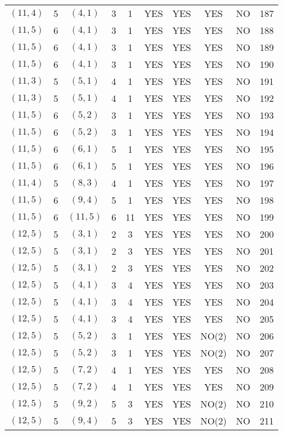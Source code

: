 \begin{longtable}{|c|c|c|c|c|c|c|c|c|c|}
$(11, 4)$ & 5 & $(4, 1)$ & 3 & 1 & YES & YES & YES & NO & 187\\
$(11, 5)$ & 6 & $(4, 1)$ & 3 & 1 & YES & YES & YES & NO & 188\\
$(11, 5)$ & 6 & $(4, 1)$ & 3 & 1 & YES & YES & YES & NO & 189\\
$(11, 5)$ & 6 & $(4, 1)$ & 3 & 1 & YES & YES & YES & NO & 190\\
$(11, 3)$ & 5 & $(5, 1)$ & 4 & 1 & YES & YES & YES & NO & 191\\
$(11, 3)$ & 5 & $(5, 1)$ & 4 & 1 & YES & YES & YES & NO & 192\\
$(11, 5)$ & 6 & $(5, 2)$ & 3 & 1 & YES & YES & YES & NO & 193\\
$(11, 5)$ & 6 & $(5, 2)$ & 3 & 1 & YES & YES & YES & NO & 194\\
$(11, 5)$ & 6 & $(6, 1)$ & 5 & 1 & YES & YES & YES & NO & 195\\
$(11, 5)$ & 6 & $(6, 1)$ & 5 & 1 & YES & YES & YES & NO & 196\\
$(11, 4)$ & 5 & $(8, 3)$ & 4 & 1 & YES & YES & YES & NO & 197\\
$(11, 5)$ & 6 & $(9, 4)$ & 5 & 1 & YES & YES & YES & NO & 198\\
$(11, 5)$ & 6 & $(11, 5)$ & 6 & 11 & YES & YES & YES & NO & 199\\
$(12, 5)$ & 5 & $(3, 1)$ & 2 & 3 & YES & YES & YES & NO & 200\\
$(12, 5)$ & 5 & $(3, 1)$ & 2 & 3 & YES & YES & YES & NO & 201\\
$(12, 5)$ & 5 & $(3, 1)$ & 2 & 3 & YES & YES & YES & NO & 202\\
$(12, 5)$ & 5 & $(4, 1)$ & 3 & 4 & YES & YES & YES & NO & 203\\
$(12, 5)$ & 5 & $(4, 1)$ & 3 & 4 & YES & YES & YES & NO & 204\\
$(12, 5)$ & 5 & $(4, 1)$ & 3 & 4 & YES & YES & YES & NO & 205\\
$(12, 5)$ & 5 & $(5, 2)$ & 3 & 1 & YES & YES & NO(2) & NO & 206\\
$(12, 5)$ & 5 & $(5, 2)$ & 3 & 1 & YES & YES & NO(2) & NO & 207\\
$(12, 5)$ & 5 & $(7, 2)$ & 4 & 1 & YES & YES & YES & NO & 208\\
$(12, 5)$ & 5 & $(7, 2)$ & 4 & 1 & YES & YES & YES & NO & 209\\
$(12, 5)$ & 5 & $(9, 2)$ & 5 & 3 & YES & YES & NO(2) & NO & 210\\
$(12, 5)$ & 5 & $(9, 4)$ & 5 & 3 & YES & YES & NO(2) & NO & 211\\

\end{longtable}
